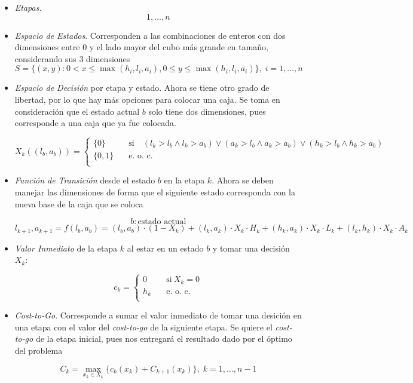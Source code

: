 \documentclass[letterpaper,10pt]{article}
\begin{document}
\begin{itemize}

\item \textit{Etapas.}    $$1, \ldots, n$$

\item \textit{Espacio de Estados}. Corresponden a las combinaciones de enteros con dos dimensiones entre 0 y el lado mayor del cubo más grande en tamaño, considerando sus 3 dimensiones
$$S = \{(x,y): 0 < x \leq \max(h_i, l_i,a_i), 0 \leq y \leq \max(h_i, l_i, a_i)\}, \; i = 1, \ldots, n$$ 

\item \textit{Espacio de Decisión} por etapa y estado. Ahora se tiene otro grado de libertad, por lo que hay más opciones para colocar una caja. Se toma en consideración que el estado actual $b$ solo tiene dos dimensiones, pues corresponde a una caja que ya fue colocada.

\[
    X_k((l_b, a_b)) =
         \begin{cases}
           \{0\} &\quad\text{si}\quad (l_k > l_b \wedge l_k > a_b) \vee  (a_k > l_b \wedge a_k > a_b) \vee (h_k > l_b \wedge h_k > a_b)   \\
           \{0,1\} &\quad\text{e. o. c. } \\
           
         \end{cases}
\]

\item \textit{Función de Transición} desde el estado $b$ en la etapa $k$. Ahora se deben manejar las dimensiones de forma que el siguiente estado corresponda con la nueva base de la caja que se coloca

$$ b: \text{estado actual}$$
$$l_{k+1}, a_{k+1} = f(l_b, a_b) = (l_b, a_b)\cdot (1-X_k) + (l_k, a_k)\cdot X_k\cdot H_k + (h_k, a_k)\cdot X_k\cdot  L_k + (l_k, h_k)\cdot X_k \cdot A_k $$

\item \textit{Valor Inmediato} de la etapa $k$ al estar en un estado $b$ y tomar una decisión $X_k$:

\[
    c_k =
         \begin{cases}
           0 &\quad\text{si} \ X_k = 0  \\
           h_k &\quad\text{e. o. c. } \\
         \end{cases}
\]

\item \textit{Cost-to-Go}. Corresponde a sumar el valor inmediato de tomar una desición en una etapa con el valor del \textit{cost-to-go} de la siguiente etapa. Se quiere el \textit{cost-to-go} de la etapa inicial, pues nos entregará el resultado dado por el óptimo del problema



$$C_k = \max_{x_k \in X_k}\{c_k(x_k) + C_{k+1}(x_{k})\}, \; k = 1, \ldots, n-1$$

\end{itemize}
\end{document}
